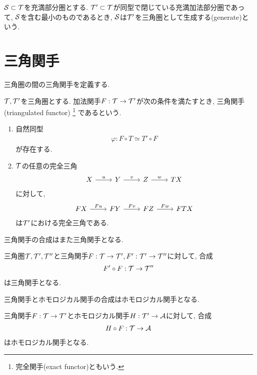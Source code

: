 \documentclass[uplatex, a4paper, 14Q, dvipdfmx]{jsarticle}
\begin{document}
\begin{definition}[生成]
  $\S \subset \T$を充満部分圏とする. 
  $\T' \subset \T$が同型で閉じている充満加法部分圏であって, $\S$を含む最小のものであるとき, $\S$は$\T'$を三角圏として生成する(generate)という. 
\end{definition}

\section{三角関手}

三角圏の間の三角関手を定義する. 

\begin{definition}[三角関手]
  $\T, \T'$を三角圏とする. 
  加法関手$F: \T \to \T'$が次の条件を満たすとき, 三角関手(triangulated functor)
  \footnote{
    完全関手(exact functor)ともいう. 
  }
  であるという.
  \begin{enumerate}
    \item 自然同型
    \begin{align*}
      \varphi: F \circ T \simeq T' \circ F
    \end{align*}
    が存在する. 
    \item $\T$の任意の完全三角
    \[\begin{tikzcd}
      X & Y & Z & TX
      \arrow["u", from=1-1, to=1-2]
      \arrow["v", from=1-2, to=1-3]
      \arrow["w", from=1-3, to=1-4]
    \end{tikzcd}\]
    に対して, 
    \[\begin{tikzcd}
      FX & FY & FZ & FTX
      \arrow["Fu", from=1-1, to=1-2]
      \arrow["Fv", from=1-2, to=1-3]
      \arrow["Fw", from=1-3, to=1-4]
    \end{tikzcd}\]
    は$\T'$における完全三角である. 
  \end{enumerate}
\end{definition}

三角関手の合成はまた三角関手となる. 

\begin{lemma}
  三角圏$\T, \T', \T''$と三角関手$F: \T \to \T', F': \T' \to \T''$に対して, 合成
  \begin{align*}
    F' \circ F: \T \to \T''
  \end{align*}
  は三角関手となる. 
\end{lemma}

三角関手とホモロジカル関手の合成はホモロジカル関手となる. 

\begin{lemma}
  三角関手$F: \T \to \T'$とホモロジカル関手$H: \T' \to \A$に対して, 合成
  \begin{align*}
    H \circ F: \T \to \A
  \end{align*}
  はホモロジカル関手となる. 
\end{lemma}
\end{document}
